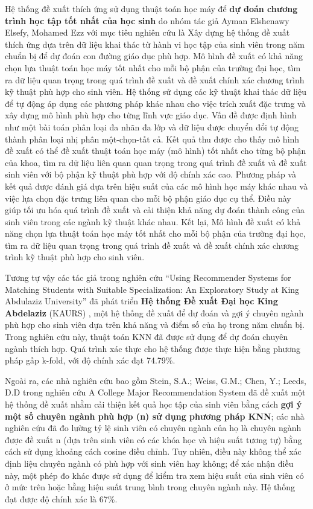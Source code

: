 Hệ thống đề xuất thích ứng sử dụng thuật toán học máy để \textbf{dự đoán chương trình học tập tốt nhất của học sinh} do nhóm tác giả Ayman Elshenawy Elsefy, Mohamed Ezz \cite{mohamed} với mục tiêu nghiên cứu là Xây dựng hệ thống đề xuất thích ứng dựa trên dữ liệu khai thác từ hành vi học tập của sinh viên trong năm chuẩn bị để dự đoán con đường giáo dục phù hợp. Mô hình đề xuất có khả năng chọn lựa thuật toán học máy tốt nhất cho mỗi bộ phận của trường đại học, tìm ra dữ liệu quan trọng trong quá trình đề xuất và đề xuất chính xác chương trình kỹ thuật phù hợp cho sinh viên. Hệ thống sử dụng các kỹ thuật khai thác dữ liệu để tự động áp dụng các phương pháp khác nhau cho việc trích xuất đặc trưng và xây dựng mô hình phù hợp cho từng lĩnh vực giáo dục. Vấn đề được định hình như một bài toán phân loại đa nhãn đa lớp và dữ liệu được chuyển đổi tự động thành phân loại nhị phân một-chọn-tất cả. Kết quả thu được cho thấy mô hình đề xuất có thể đề xuất thuật toán học máy (mô hình) tốt nhất cho từng bộ phận của khoa, tìm ra dữ liệu liên quan quan trọng trong quá trình đề xuất và đề xuất sinh viên với bộ phận kỹ thuật phù hợp với độ chính xác cao. Phương pháp và kết quả được đánh giá dựa trên hiệu suất của các mô hình học máy khác nhau và việc lựa chọn đặc trưng liên quan cho mỗi bộ phận giáo dục cụ thể. Điều này giúp tối ưu hóa quá trình đề xuất và cải thiện khả năng dự đoán thành công của sinh viên trong các ngành kỹ thuật khác nhau. Kết lại, Mô hình đề xuất có khả năng chọn lựa thuật toán học máy tốt nhất cho mỗi bộ phận của trường đại học, tìm ra dữ liệu quan trọng trong quá trình đề xuất và đề xuất chính xác chương trình kỹ thuật phù hợp cho sinh viên. 

Tương tự vậy các tác giả trong nghiên cứu “Using Recommender Systems for Matching Students with Suitable Specialization: An Exploratory Study at King Abdulaziz University” đã phát triển \textbf{Hệ thống Đề xuất Đại học King Abdelaziz} (KAURS) \cite{khloud}, một hệ thống đề xuất để dự đoán và gợi ý chuyên ngành phù hợp cho sinh viên dựa trên khả năng và điểm số của họ trong năm chuẩn bị. Trong nghiên cứu này, thuật toán KNN đã được sử dụng để dự đoán chuyên ngành thích hợp. Quá trình xác thực cho hệ thống được thực hiện bằng phương pháp gấp k-fold, với độ chính xác đạt 74.79\%.

Ngoài ra, các nhà nghiên cứu bao gồm Stein, S.A.; Weiss, G.M.; Chen, Y.; Leeds, D.D trong nghiên cứu A College Major Recommendation System \cite{researchgate} đã đề xuất một hệ thống đề xuất nhằm cải thiện kết quả học tập của sinh viên bằng cách \textbf{gợi ý một số chuyên ngành phù hợp (n) sử dụng phương pháp KNN}; các nhà nghiên cứu đã đo lường tỷ lệ sinh viên có chuyên ngành của họ là chuyên ngành được đề xuất n (dựa trên sinh viên có các khóa học và hiệu suất tương tự) bằng cách sử dụng khoảng cách cosine điều chỉnh. Tuy nhiên, điều này không thể xác định liệu chuyên ngành có phù hợp với sinh viên hay không; để xác nhận điều này, một phép đo khác được sử dụng để kiểm tra xem hiệu suất của sinh viên có ở mức trên hoặc bằng hiệu suất trung bình trong chuyên ngành này. Hệ thống đạt được độ chính xác là 67\%.

